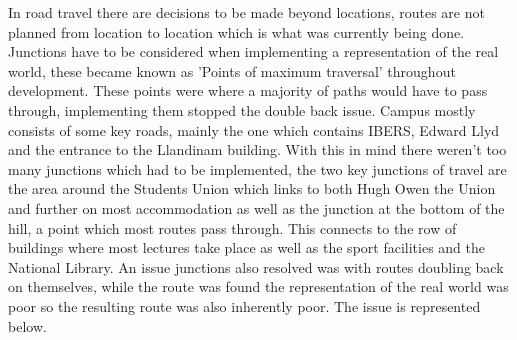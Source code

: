 In road travel there are decisions to be made beyond locations, routes are not planned from location to location which is what was currently being done. Junctions have to be considered when implementing a representation of the real world, these became known as 'Points of maximum traversal' throughout development. These points were where a majority of paths would have to pass through, implementing them stopped the double back issue. Campus mostly consists of some key roads, mainly the one which contains IBERS, Edward Llyd and the entrance to the Llandinam building. With this in mind there weren't too many junctions which had to be implemented, the two key junctions of travel are the area around the Students Union which links to both Hugh Owen the Union and further on most accommodation as well as the junction at the bottom of the hill, a point which most routes pass through. This connects to the row of buildings where most lectures take place as well as the sport facilities and the National Library. An issue junctions also resolved was with routes doubling back on themselves, while the route was found the representation of the real world was poor so the resulting route was also inherently poor. The issue is represented below.

